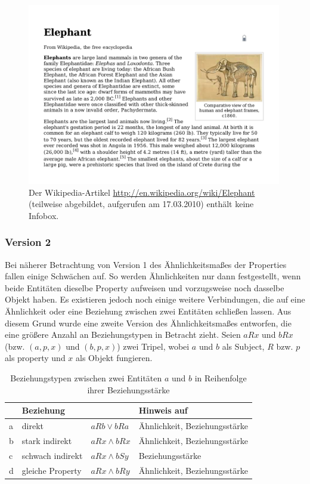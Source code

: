 \begin{figure}[tbh]
\includegraphics[width=0.99\textwidth]{img/pdf/elephant_wikipedia.pdf}
\caption[]{Der Wikipedia-Artikel \url{http://en.wikipedia.org/wiki/Elephant} (teilweise abgebildet, aufgerufen am 17.03.2010) enthält keine Infobox.}
\label{fig:wikipedia-elephant}
\end{figure}

\subsubsection{Version 2}
Bei näherer Betrachtung von Version 1 des Ähnlichkeitsmaßes der Properties fallen einige Schwächen auf.
So werden Ähnlichkeiten nur dann festgestellt, wenn beide Entitäten dieselbe Property aufweisen und vorzugsweise noch dasselbe Objekt haben.
Es existieren jedoch noch einige weitere Verbindungen, die auf eine Ähnlichkeit oder eine Beziehung zwischen zwei Entitäten schließen lassen.
Aus diesem Grund wurde eine zweite Version des Ähnlichkeitsmaßes entworfen, die eine größere Anzahl an Beziehungstypen in Betracht zieht.
Seien $aRx$ und $bRx$ (bzw. $(a,p,x)$ und $(b,p,x)$) zwei Tripel, wobei $a$ und $b$ als Subject, $R$ bzw. $p$ als property und $x$ als Objekt fungieren.
\begin{table}[h]
\begin{center}
\begin{tabular}{llll}
\toprule
	&Beziehung			&			&Hinweis auf\\
\midrule
a	&direkt				&$aRb \lor  bRa$	&Ähnlichkeit, Beziehungsstärke\\
b	&stark indirekt 		&$aRx \land bRx$	&Ähnlichkeit, Beziehungsstärke\\
c	&schwach indirekt		&$aRx \land bSy$	&Beziehungsstärke\\
d	&gleiche Property		&$aRx \land bRy$	&Ähnlichkeit, Beziehungsstärke\\
\bottomrule
\end{tabular}
\end{center}
\caption{Beziehungstypen zwischen zwei Entitäten $a$ und $b$ in Reihenfolge ihrer Beziehungsstärke}
\label{tab:disambiguierung-properties}
\end{table}

